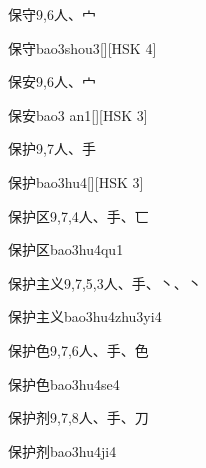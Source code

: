 \begin{entry}{保守}{9,6}{⼈、⼧}
  \begin{phonetics}{保守}{bao3shou3}[][HSK 4]
  \end{phonetics}
\end{entry}

\begin{entry}{保安}{9,6}{⼈、⼧}
  \begin{phonetics}{保安}{bao3 an1}[][HSK 3]
  \end{phonetics}
\end{entry}

\begin{entry}{保护}{9,7}{⼈、⼿}
  \begin{phonetics}{保护}{bao3hu4}[][HSK 3]
  \end{phonetics}
\end{entry}

\begin{entry}{保护区}{9,7,4}{⼈、⼿、⼖}
  \begin{phonetics}{保护区}{bao3hu4qu1}
  \end{phonetics}
\end{entry}

\begin{entry}{保护主义}{9,7,5,3}{⼈、⼿、⼂、⼂}
  \begin{phonetics}{保护主义}{bao3hu4zhu3yi4}
  \end{phonetics}
\end{entry}

\begin{entry}{保护色}{9,7,6}{⼈、⼿、⾊}
  \begin{phonetics}{保护色}{bao3hu4se4}
  \end{phonetics}
\end{entry}

\begin{entry}{保护剂}{9,7,8}{⼈、⼿、⼑}
  \begin{phonetics}{保护剂}{bao3hu4ji4}
  \end{phonetics}
\end{entry}

